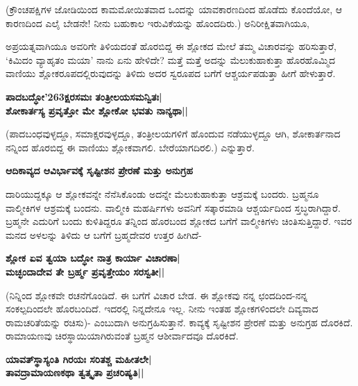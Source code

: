 (ಕ್ರೌಂಚಪಕ್ಷಿಗಳ ಜೋಡಿಯಿಂದ ಕಾಮಮೋಯಿತವಾದ ಒಂದನ್ನು ಯಾವಕಾರಣದಿಂದ ಹೊಡೆದು ಕೊಂದೆಯೋ, ಆ ಕಾರಣದಿಂದ ಎಲೈ ಬೇಡನೇ! ನೀನು ಬಹುಕಾಲ ಇರುವಿಕೆಯನ್ನು ಹೊಂದದಿರು.) ಅನಿರೀಕ್ಷಿತವಾಗಿಯೂ, 

ಅಪ್ರಯತ್ನವಾಗಿಯೂ ಅವರಿಗೇ ತಿಳಿಯದಂತೆ ಹೊರಬಿದ್ದ ಈ ಶ್ಲೋಕದ ಮೇಲೆ ತಮ್ಮ ವಿಚಾರವನ್ನು ಹರಿಸುತ್ತಾರೆ, `ಕಿಮಿದಂ ವ್ಯಾಹೃತಂ ಮಯಾ' ನಾನು ಏನು ಹೇಳಿದೇ? ಮತ್ತೆ ಮತ್ತೆ ಅದನ್ನು ಮೆಲುಕುಹಾಕುತ್ತಾ ಹೊರಹೊಮ್ಮಿದ ವಾಣಿಯು ಶ್ಲೋಕರೂಪದಲ್ಲಿರುವುದನ್ನು ತಿಳಿದು ಅದರ ಸ್ವರೂಪದ ಬಗೆಗೆ ಆಶ್ಚರ್ಯಪಡುತ್ತಾ ಹೀಗೆ ಹೇಳುತ್ತಾರೆ. 


\begin{center} 

{\bf ಪಾದಬದ್ಧೋ\char'263ಕ್ಷರಸಮಃ ತಂತ್ರೀಲಯಸಮನ್ವಿತಃ|\\ 

ಶೋಕಾರ್ತಸ್ಯ ಪ್ರವೃತ್ತೋ ಮೇ ಶ್ಲೋಕೋ ಭವತು ನಾನ್ಯಥಾ||} 

\end{center} 


(ಪಾದಬಂಧವುಳ್ಳದ್ದೂ, ಸಮಾಕ್ಷರವುಳ್ಳದ್ದೂ, ತಂತ್ರೀಲಯಗಳಿಗೆ ಹೊಂದುವ ನಡೆಯುಳ್ಳದ್ದೂ ಆಗಿ, ಶೋಕಾರ್ತನಾದ ನನ್ನಿಂದ ಹೊರಬಿದ್ದ ಈ ವಾಣಿಯು ಶ್ಲೋಕವಾಗಲಿ. ಬೇರೆಯಾಗದಿರಲಿ.) ಎನ್ನುತ್ತಾರೆ. 


{\bf ಆದಿಕಾವ್ಯದ ಆವಿರ್ಭಾವಕ್ಕೆ ಸೃಷ್ಟೀಶನ ಪ್ರೇರಣೆ ಮತ್ತು ಅನುಗ್ರಹ} 


ದಾರಿಯುದ್ದಕ್ಕೂ ಆ ಶ್ಲೋಕವನ್ನೇ ನೆನೆಸಿಕೊಂಡು ಅದನ್ನೇ ಮೆಲುಕುಹಾಕುತ್ತಾ ಆಶ್ರಮಕ್ಕೆ ಬಂದರು. ಬ್ರಹ್ಮನೂ ವಾಲ್ಮೀಕಿಗಳ ಆಶ್ರಮಕ್ಕೆ ಬಂದನು. ವಾಲ್ಮೀಕಿ ಮಹರ್ಷಿಗಳು ಅವನಿಗೆ ಸತ್ಕಾರಮಾಡಿ ಆಶ್ಚರ್ಯದಿಂದ ಸ್ತಬ್ಧರಾಗಿದ್ದಾರೆ. ಬ್ರಹ್ಮನೇ ಎದುರಿಗೆ ಬಂದು ಕುಳಿತಿದ್ದರೂ ತನ್ನಿಂದ ಹೊರಬಂದ ಶ್ಲೋಕದ ಬಗೆಗೆ ವಾಲ್ಮೀಕಿಗಳು ಚಿಂತಿಸುತ್ತಿದ್ದಾರೆ. ಇವರ ಮನದ ಅಳಲನ್ನು ತಿಳಿದು ಆ ಬಗೆಗೆ ಬ್ರಹ್ಮದೇವರ ಉತ್ತರ ಹೀಗಿದೆ- 


\begin{center} 

{\bf ಶ್ಲೋಕ ಏವ ತ್ವಯಾ ಬದ್ಧೋ ನಾತ್ರ ಕಾರ್ಯಾ ವಿಚಾರಣಾ|\\ 

ಮಚ್ಛಂದಾದೇವ ತೇ ಬ್ರರ್ಹ್ಮ ಪ್ರವೃತ್ತೇಯಂ ಸರಸ್ವತೀ||} 

\end{center} 


(ನಿನ್ನಿಂದ ಶ್ಲೋಕವೇ ರಚನೆಗೊಂಡಿದೆ. ಈ ಬಗೆಗೆ ವಿಚಾರ ಬೇಡ. ಈ ಶ್ಲೋಕವು ನನ್ನ ಛಂದದಿಂದ-ನನ್ನ ಸಂಕಲ್ಪದಿಂದಲೇ ಹೊರಬಂದಿದೆ. ಇದರಲ್ಲಿ ನಿನ್ನದೇನೂ ಇಲ್ಲ. ನೀನು ಇಂತಹ ಶ್ಲೋಕಗಳಿಂದಲೇ ದಿವ್ಯವಾದ ರಾಮಚರಿತೆಯನ್ನು ರಚಿಸು)- ಎಂಬುದಾಗಿ ಅನುಗ್ರಹಿಸುತ್ತಾನೆ. ಕಾವ್ಯಕ್ಕೆ ಸೃಷ್ಟೀಶನ ಪ್ರೇರಣೆ ಮತ್ತು ಅನುಗ್ರಹ ದೊರಕಿದೆ. ರಾಮಾಯಣವು ಚಿರಸ್ಥಾಯಿಯಾಗಿರುವಂತೆ ಬ್ರಹ್ಮನ ಆಶೀರ್ವಾದವೂ ದೊರಕಿದೆ. 


\begin{center} 

{\bf ಯಾವತ್‍ಸ್ಥಾಸ್ಯಂತಿ ಗಿರಯಃ ಸರಿತಶ್ಚ ಮಹೀತಲೇ|\\ 

ತಾವದ್ರಾಮಾಯಣಕಥಾ ತ್ವತ್ಕೃತಾ ಪ್ರಚರಿಷ್ಯತಿ||} 

\end{center} 


